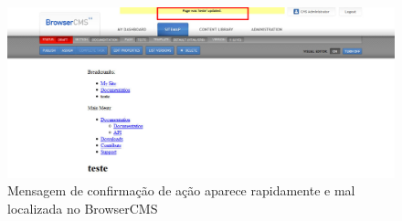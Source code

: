 \begin{figure}[here]
\includegraphics[width=150mm]{images/browsercms_erro_msg_confirmacao.jpg}
\caption{Mensagem de confirmação de ação aparece rapidamente e mal localizada no BrowserCMS}
\label{fig:browsercms_erro_msg_confirmacao}
\end{figure}

